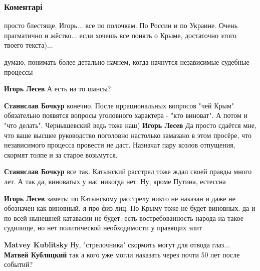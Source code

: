  
 
 
 
 
\subsubsection{Коментарі}
\label{sec:03_07_2018.fb.lesev_igor.1.chej_krym.cmt}

\begin{itemize} %

просто блестяще, Игорь... все по полочкам. По России и по Украине. Очень
прагматично и жёстко... если хочешь все понять о Крыме, достаточно этого твоего
текста)...

\begin{itemize} %
думаю, понимать более детально начнем, когда начнутся независимые судебные процессы

\textbf{Игорь Лесев} А есть на то шансы?

\textbf{Станислав Бочкур} конечно. После иррациональных вопросов "чей Крым" обязательно появятся вопросы уголовного характера - "кто виноват". А потом и "что делать". Чернышевский ведь тоже наш)
\textbf{Игорь Лесев} Да просто сдаётся мне, что ваше высшее руководство поголовно настолько замазано в этом просёре, что независимого процесса провести не даст. Назначат пару козлов отпущения, скормят толпе и за старое возьмутся.

\textbf{Станислав Бочкур} все так. Катынский расстрел тоже ждал своей правды много лет. А так да, виноватых у нас никогда нет. Ну, кроме Путина, естессна

\textbf{Игорь Лесев} заметь: по Катынскому расстрелу никто не наказан и даже не обозначен как виновный. я про физ лиц. По Крыму тоже не будет виновных. да и по всей нынешней катавасии не будет. есть востребованность народа на такое судилище, но нет политической необходимости у правящих элит

\textbf{Matvey Kublitsky} Ну, "стрелочника" скормить могут для отвода глаз...
\textbf{Матвей Кублицкий} так а кого уже могли наказать через почти 50 лет после событий?


\end{itemize}
\end{itemize}
